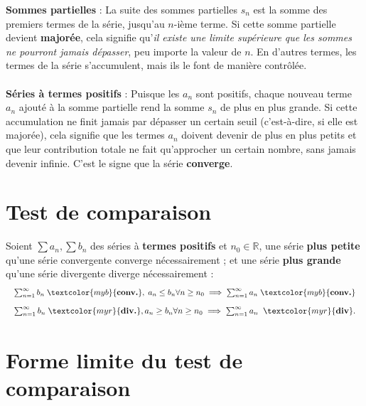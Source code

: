 \documentclass{report}
\begin{document}
\begin{multicols*}{3}
        \textbf{Sommes partielles} : La suite des sommes partielles \(s_n\) est la somme des 
        premiers termes de la série, jusqu'au \(n\)-ième terme. Si cette somme partielle 
        devient \textbf{majorée}, cela signifie qu'\textit{il existe une limite supérieure que les 
        sommes ne pourront jamais dépasser}, peu importe la valeur de \(n\). En d'autres 
        termes, les termes de la série s'accumulent, mais ils le font de manière contrôlée.
        \\\\
        \textbf{Séries à termes positifs} : Puisque les \(a_n\) sont positifs, chaque nouveau 
        terme \(a_n\) ajouté à la somme partielle rend la somme \(s_n\) de plus en plus 
        grande. Si cette accumulation ne finit jamais par dépasser un certain seuil 
        (c'est-à-dire, si elle est majorée), cela signifie que les termes \(a_n\) doivent 
        devenir de plus en plus petits et que leur contribution totale ne fait qu'approcher 
        un certain nombre, sans jamais devenir infinie. C'est le signe que la série 
        \textbf{converge}.


    \vspace{-1em}
    \section{Test de comparaison}
        Soient $\sum a_n, \sum b_n$ des séries à \textbf{termes positifs} 
        et $n_0 \in \mathbb{R}$, une série \textbf{plus petite} qu'une série convergente 
        converge nécessairement ; et une série \textbf{plus grande} qu'une série 
        divergente diverge nécessairement :
        \begin{align*}
        \resizebox{1\linewidth}{!}{$ 
         \sum_{n=1}^{\infty }b_n  \; \textcolor{myb}{\textbf{conv.}}, \; 
                   a_n \leq b_n \forall n \geq n_0\implies 
                   \sum_{n=1}^{\infty }a_n \; \textcolor{myb}{\textbf{conv.}}  
        $}
        \end{align*}
        \begin{align*}
        \resizebox{1\linewidth}{!}{$ 
         \sum_{n=1}^{\infty }b_n  \; \textcolor{myr}{\textbf{div.}}, 
                   a_n \geq b_n \forall n \geq n_0 \implies 
                   \sum_{n=1}^{\infty }a_n \;\; \textcolor{myr}{\textbf{div}}.  
        $}
        \end{align*}                
\section{Forme limite du test de comparaison}


\end{multicols*}
\end{document}
